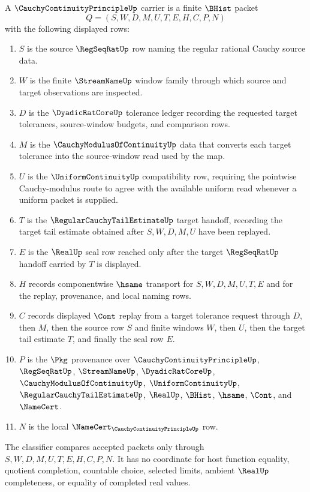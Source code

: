 \begin{definition}
\label{def:cauchy-continuity-principle-carrier}
A $\CauchyContinuityPrincipleUp$ carrier is a finite $\BHist$ packet
$$
Q=(S,W,D,M,U,T,E,H,C,P,N)
$$
with the following displayed rows:
\begin{enumerate}
\item $S$ is the source $\RegSeqRatUp$ row naming the regular rational Cauchy source data.
\item $W$ is the finite $\StreamNameUp$ window family through which source and target observations are inspected.
\item $D$ is the $\DyadicRatCoreUp$ tolerance ledger recording the requested target tolerances, source-window budgets, and comparison rows.
\item $M$ is the $\CauchyModulusOfContinuityUp$ data that converts each target tolerance into the source-window read used by the map.
\item $U$ is the $\UniformContinuityUp$ compatibility row, requiring the pointwise Cauchy-modulus route to agree with the available uniform read whenever a uniform packet is supplied.
\item $T$ is the $\RegularCauchyTailEstimateUp$ target handoff, recording the target tail estimate obtained after $S,W,D,M,U$ have been replayed.
\item $E$ is the $\RealUp$ seal row reached only after the target $\RegSeqRatUp$ handoff carried by $T$ is displayed.
\item $H$ records componentwise $\hsame$ transport for $S,W,D,M,U,T,E$ and for the replay, provenance, and local naming rows.
\item $C$ records displayed $\Cont$ replay from a target tolerance request through $D$, then $M$, then the source row $S$ and finite windows $W$, then $U$, then the target tail estimate $T$, and finally the seal row $E$.
\item $P$ is the $\Pkg$ provenance over $\CauchyContinuityPrincipleUp$, $\RegSeqRatUp$, $\StreamNameUp$, $\DyadicRatCoreUp$, $\CauchyModulusOfContinuityUp$, $\UniformContinuityUp$, $\RegularCauchyTailEstimateUp$, $\RealUp$, $\BHist$, $\hsame$, $\Cont$, and $\NameCert$.
\item $N$ is the local $\NameCert_{\CauchyContinuityPrincipleUp}$ row.
\end{enumerate}
The classifier compares accepted packets only through $S,W,D,M,U,T,E,H,C,P,N$. It has no coordinate for host function equality, quotient completion, countable choice, selected limits, ambient $\RealUp$ completeness, or equality of completed real values.
\end{definition}

